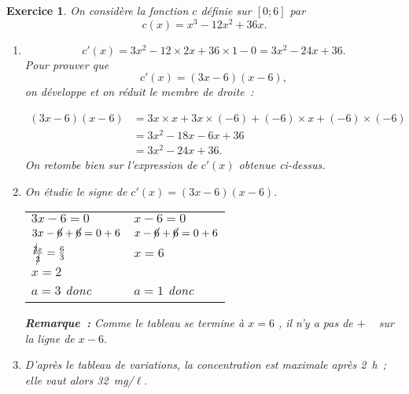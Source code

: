 \documentclass[10pt]{article}
\newtheorem{exo}{Exercice}
\begin{document}
\begin{exo}

On considère la fonction $c$ définie sur $\left[0;6\right]$ par \[c(x)=x^3-12x^2+36x.\]
 
\begin{enumerate}
\item \[c'(x)= 3x^2-12\times 2x+36\times 1-0=3x^2-24x+36.\] Pour prouver que
\[c'(x)=(3x-6)(x-6),\] on développe et on réduit le membre de droite~:

\begin{align*}
(3x-6)(x-6)&=3x\times x+3x\times (-6)+(-6)\times x +(-6)\times (-6)\\
&=3x^2-18x-6x+36\\
&=3x^2-24x+36.\end{align*} On retombe bien sur l'expression de $c'(x)$ obtenue ci-dessus.
\item On étudie le signe de $c'(x)=(3x-6)(x-6).$

\medskip

{\setlength{\arrayrulewidth}{2pt}
\begin{center}
\begin{tabular}{l|l}
$3x-6=0$&$x-6=0$\\
$3x-\cancel{6}+\cancel{6}=0+6$&$x-\cancel{6}+\cancel{6}=0+6$\\
$\frac{\cancel{3}x}{\cancel{3}}=\frac{6}{3}$&$x=6$\\
$x=2$& \\
$a=3$ donc \fbox{$-~\upphi~+$}&$a=1$ donc \fbox{$-~\upphi~+$}
\end{tabular}
\end{center}}

\medskip


\begin{center}
\end{center}

\medskip

\textbf{Remarque~:} Comme le tableau \og se termine à $x=6$ \fg , il n'y a pas de \og $+$ \fg~{} sur la ligne de $x-6.$

\item D'après le tableau de variations, la concentration est maximale après 2~h~; elle vaut alors 32~mg/$\ell.$


\end{enumerate}


\end{exo}
\end{document}
